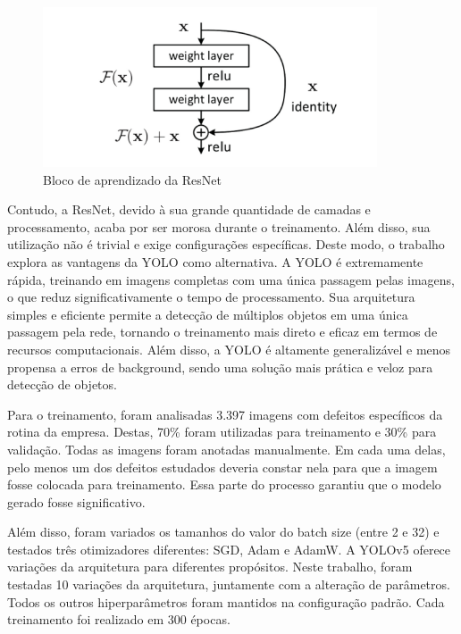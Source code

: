 \begin{figure}[!h]
    \center
    \begin{minipage}{0.9\linewidth}
        \center
        \captionsetup{justification=centering,margin=0.5cm,font=small}
        \includegraphics[width=0.7\linewidth]{img/cap3/salto.png}
        \caption{Bloco de aprendizado da ResNet \cite{he2016deep}}
        \label{fig:salto}
    \end{minipage}
\end{figure}

Contudo, a ResNet, devido à sua grande quantidade de camadas e processamento, acaba por ser morosa durante o treinamento. Além disso, sua utilização não é trivial e exige configurações específicas. Deste modo, o trabalho explora as vantagens da YOLO como alternativa. A YOLO é extremamente rápida, treinando em imagens completas com uma única passagem pelas imagens, o que reduz significativamente o tempo de processamento. Sua arquitetura simples e eficiente permite a detecção de múltiplos objetos em uma única passagem pela rede, tornando o treinamento mais direto e eficaz em termos de recursos computacionais. Além disso, a YOLO é altamente generalizável e menos propensa a erros de background, sendo uma solução mais prática e veloz para detecção de objetos.	

Para o treinamento, foram analisadas 3.397 imagens com defeitos específicos da rotina da empresa. Destas, 70\% foram utilizadas para treinamento e 30\% para validação. Todas as imagens foram anotadas manualmente. Em cada uma delas, pelo menos um dos defeitos estudados deveria constar nela para que a imagem fosse colocada para treinamento. Essa parte do processo garantiu que o modelo gerado fosse significativo.

Além disso, foram variados os tamanhos do valor do batch size (entre 2 e 32) e testados três otimizadores diferentes: SGD, Adam e AdamW. A YOLOv5 oferece variações da arquitetura para diferentes propósitos. Neste trabalho, foram testadas 10 variações da arquitetura, juntamente com a alteração de parâmetros. Todos os outros hiperparâmetros foram mantidos na configuração padrão. Cada treinamento foi realizado em 300 épocas.

